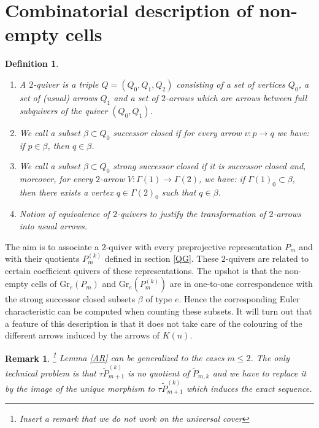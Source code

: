 \documentclass{amsart}
\newtheorem{definition}[theorem]{Definition}
\newtheorem{remark}[theorem]{Remark}
\newcommand{\Gr}{\mathrm{Gr}}
\begin{document}
\section{Combinatorial description of non-empty cells}
                                   
\begin{definition}\begin{enumerate}
\item A $2$-quiver is a triple $Q=(Q_0,Q_1,Q_2)$ consisting of a set of vertices $Q_0$, a set of (usual) arrows $Q_1$ and a set of $2$-arrows which are arrows between full subquivers of the quiver $(Q_0,Q_1)$.

\item We call a subset $\beta\subset Q_0$ successor closed if for every arrow $v:p\to q$ we have: if $p\in \beta$, then $q\in\beta$.

\item We call a subset $\beta\subset Q_0$ strong successor closed if it is successor closed and, moreover, for every $2$-arrow $V:\Gamma(1)\to\Gamma(2)$, we have: if $\Gamma(1)_0\subset \beta$, then there exists a vertex $q\in\Gamma(2)_0$ such that $q\in\beta$.

\item Notion of equivalence of $2$-quivers to justify the transformation of $2$-arrows into usual arrows.

\end{enumerate}
\end{definition}

The aim is to associate a $2$-quiver with every preprojective representation $P_m$ and with their quotients $P_m^{(k)}$ defined in section \ref{QG}. These $2$-quivers are related to certain coefficient quivers of these representations. The upshot is that the non-empty cells of $\Gr_e(P_m)$ and $\Gr_e(P_m^{(k)})$ are in one-to-one correspondence with the strong successor closed subsets $\beta$ of type $e$. Hence the corresponding Euler characteristic can be computed when counting these subsets. It will turn out that a feature of this description is that it does not take care of the colouring of the different arrows induced by the arrows of $K(n)$.

\begin{remark}\footnote{Insert a remark that we do not work on the universal cover} 
Lemma \ref{AR} can be generalized to the cases $m\leq 2$. The only technical problem is that $\tau \tilde P^{(k)}_{m+1}$ is no quotient of $\tilde P_{m,k}$ and we have to replace it by the image of the unique morphism to $\tau \tilde P^{(k)}_{m+1}$ which induces the exact sequence. 


\end{remark}
\end{document}
